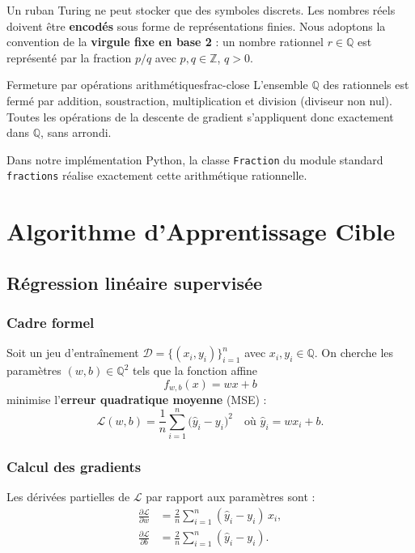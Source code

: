 \documentclass[12pt, a4paper, oneside]{report}
\begin{document}
Un ruban Turing ne peut stocker que des symboles discrets. Les nombres réels doivent être \textbf{encodés} sous forme de représentations finies. Nous adoptons la convention de la \textbf{virgule fixe en base 2} : un nombre rationnel $r \in \mathbb{Q}$ est représenté par la fraction $p/q$ avec $p, q \in \mathbb{Z}$, $q > 0$.

\begin{prop}{Fermeture par opérations arithmétiques}{frac-close}
  L'ensemble $\mathbb{Q}$ des rationnels est fermé par addition, soustraction, multiplication et division (diviseur non nul). Toutes les opérations de la descente de gradient s'appliquent donc exactement dans $\mathbb{Q}$, sans arrondi.
\end{prop}

Dans notre implémentation Python, la classe \texttt{Fraction} du module standard \texttt{fractions} réalise exactement cette arithmétique rationnelle.

\chapter{Algorithme d'Apprentissage Cible}

\section{Régression linéaire supervisée}

\subsection{Cadre formel}

Soit un jeu d'entraînement $\mathcal{D} = \{(x_i, y_i)\}_{i=1}^{n}$ avec $x_i, y_i \in \mathbb{Q}$. On cherche les paramètres $(w, b) \in \mathbb{Q}^2$ tels que la fonction affine
\[
  f_{w,b}(x) = wx + b
\]
minimise l'\textbf{erreur quadratique moyenne} (MSE) :
\[
  \mathcal{L}(w, b) = \frac{1}{n} \sum_{i=1}^{n} \bigl(\hat{y}_i - y_i\bigr)^2
  \quad \text{où } \hat{y}_i = wx_i + b.
\]

\subsection{Calcul des gradients}

Les dérivées partielles de $\mathcal{L}$ par rapport aux paramètres sont :
\begin{align}
  \frac{\partial \mathcal{L}}{\partial w} &= \frac{2}{n} \sum_{i=1}^{n} (\hat{y}_i - y_i)\, x_i, \label{eq:gradw}\\[6pt]
  \frac{\partial \mathcal{L}}{\partial b} &= \frac{2}{n} \sum_{i=1}^{n} (\hat{y}_i - y_i). \label{eq:gradb}
\end{align}
\end{document}
